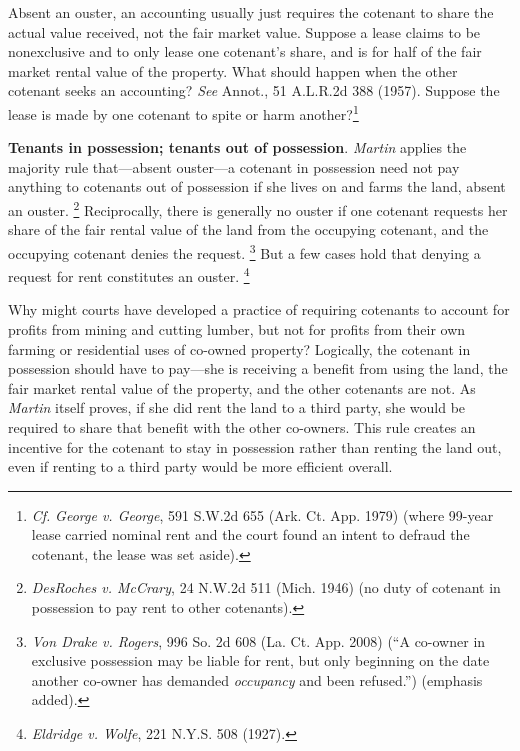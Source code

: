 Absent an ouster, an accounting usually just requires the cotenant to share the
actual value received, not the fair market value. Suppose a lease claims to be
nonexclusive and to only lease one cotenant's share, and is for half of the fair
market rental value of the property. What should happen when the other cotenant
seeks an accounting? \emph{See} Annot., 51 A.L.R.2d 388 (1957). Suppose the
lease is made by one cotenant to spite or harm another?\footnote{\textit{Cf.}
\emph{George v. George}, 591 S.W.2d 655 (Ark. Ct. App. 1979) (where 99-year
lease carried nominal rent and the court found an intent to defraud the
cotenant, the lease was set aside).}

\item \textbf{Tenants in possession; tenants out of possession}. \textit{Martin}
applies the majority rule that---absent ouster---a cotenant in possession need
not pay anything to cotenants out of possession if she lives on and farms the
land, absent an ouster. \footnote{\emph{DesRoches v. McCrary}, 24 N.W.2d 511
(Mich. 1946) (no duty of cotenant in possession to pay rent to other
cotenants).}
Reciprocally, there is generally no ouster if one cotenant requests her share of
the fair rental value of the land from the occupying cotenant, and the occupying
cotenant denies the request. \footnote{\emph{Von Drake v. Rogers}, 996 So. 2d
608 (La. Ct. App. 2008) (``A co-owner in exclusive possession may be liable for
rent, but only beginning on the date another co-owner has demanded
\textit{occupancy} and been refused.'') (emphasis added).} But a few cases hold
that denying a request
for rent constitutes an ouster. \footnote{\emph{Eldridge v. Wolfe}, 221 N.Y.S.
508 (1927).}

Why might courts have developed a practice of requiring cotenants to account for
profits from mining and cutting lumber, but not for profits from their own
farming or residential uses of co-owned property? Logically, the cotenant in
possession should have to pay---she is receiving a benefit from using the
land, the fair market rental value of the property, and the other cotenants are
not. As \textit{Martin} itself proves, if she did rent the land to a third
party, she would be required to share that benefit with the other co-owners.
This rule creates an incentive for the cotenant to stay in possession rather
than renting the land out, even if renting to a third party would be more
efficient overall.


